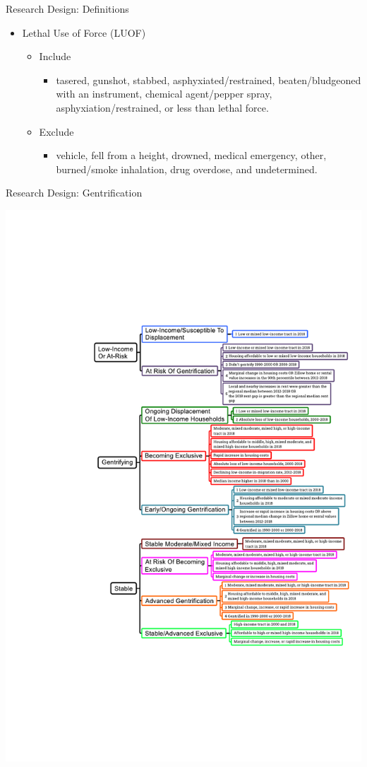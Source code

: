 \documentclass{beamer}
\begin{document}
\begin{frame}{Research Design: Definitions}
	\begin{itemize}
		\item Lethal Use of Force (LUOF)
		\begin{itemize}
			\item Include
			\begin{itemize}
				\item  tasered, gunshot, stabbed, asphyxiated/restrained, beaten/bludgeoned with an instrument, chemical agent/pepper spray, asphyxiation/restrained, or less than lethal force.
			\end{itemize}
			\item Exclude
			\begin{itemize}
				\item vehicle, fell from a height, drowned, medical emergency, other, burned/smoke inhalation, drug overdose, and undetermined.
			\end{itemize}
		\end{itemize}
	\end{itemize}
\end{frame}

\begin{frame}{Research Design: Gentrification}
\begin{center}
\includegraphics[scale=1]{images/low_income_at_risk}
\end{center}
\end{frame}
\end{document}
